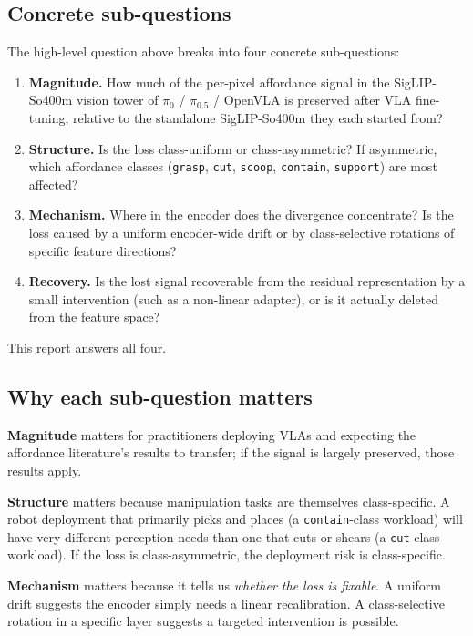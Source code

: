 \documentclass[11pt]{article}
\begin{document}
\subsection{Concrete sub-questions}

The high-level question above breaks into four concrete sub-questions:

\begin{enumerate}[leftmargin=1.3em, itemsep=0.2em, topsep=0.4em]
\item \textbf{Magnitude.} How much of the per-pixel affordance signal in
the SigLIP-So400m vision tower of $\pi_0$ / $\pi_{0.5}$ / OpenVLA is
preserved after VLA fine-tuning, relative to the standalone SigLIP-So400m
they each started from?
\item \textbf{Structure.} Is the loss class-uniform or class-asymmetric?
If asymmetric, which affordance classes (\texttt{grasp}, \texttt{cut},
\texttt{scoop}, \texttt{contain}, \texttt{support}) are most affected?
\item \textbf{Mechanism.} Where in the encoder does the divergence
concentrate? Is the loss caused by a uniform encoder-wide drift or by
class-selective rotations of specific feature directions?
\item \textbf{Recovery.} Is the lost signal recoverable from the residual
representation by a small intervention (such as a non-linear adapter), or
is it actually deleted from the feature space?
\end{enumerate}

This report answers all four.

\subsection{Why each sub-question matters}

\textbf{Magnitude} matters for practitioners deploying VLAs and expecting
the affordance literature's results to transfer; if the signal is largely
preserved, those results apply.

\textbf{Structure} matters because manipulation tasks are themselves
class-specific. A robot deployment that primarily picks and places (a
\texttt{contain}-class workload) will have very different perception
needs than one that cuts or shears (a \texttt{cut}-class workload). If
the loss is class-asymmetric, the deployment risk is class-specific.

\textbf{Mechanism} matters because it tells us \emph{whether the loss is
fixable}. A uniform drift suggests the encoder simply needs a linear
recalibration. A class-selective rotation in a specific layer suggests a
targeted intervention is possible.
\end{document}
